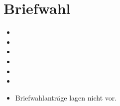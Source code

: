 \documentclass[a4paper]{scrartcl}
\newcommand{\fullcheck}{\raisebox{-.8\dp\strutbox}{\texttt{[image: Check.pdf]}}}
\newcommand{\semicheck}{\raisebox{-.8\dp\strutbox}{\texttt{[image: Semicheck.pdf]}}}
\newcommand{\nocheck}{\raisebox{-.8\dp\strutbox}{\texttt{[image: Nocheck.pdf]}}}
\newcommand{\dontknow}{\raisebox{-.8\dp\strutbox}{\texttt{[image: Dontknow.pdf]}}}
\newcommand{\notrev}{\raisebox{-.8\dp\strutbox}{\texttt{[image: Notrev.pdf]}}}
\newcommand{\sym}[1]{
\ifcase#1 \item[$\Box$]
\or \item[\fullcheck]
\or \item[\semicheck]
\or \item[\nocheck]
\or \item[\dontknow]
\or \item[\notrev]
\else \item[$\Box$]
\fi}
\begin{document}














\section{Briefwahl}
\begin{itemize}[label=$\Box$]
\sym{4} Briefwahlanträge lagen nicht vor.
\end{itemize}
\end{document}
